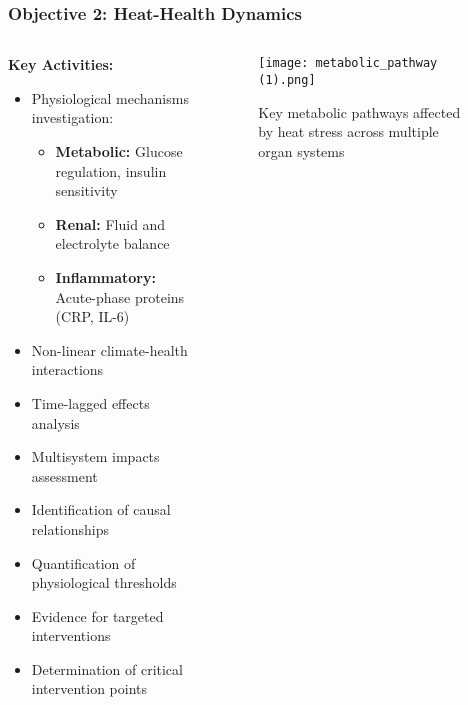 \documentclass[aspectratio=169]{beamer}
\newcommand{\concept}[1]{\textcolor{witsteal}{\textbf{#1}}}
\begin{document}
\begin{frame}
    \frametitle{Objective 2: Heat-Health Dynamics}
    
    \begin{columns}[T]
        \begin{column}{0.55\textwidth}
            \textbf{\large Key Activities:}
            \begin{itemize}[leftmargin=*, itemsep=6pt]
                \item Physiological mechanisms investigation:
                \begin{itemize}[itemsep=4pt]
                    \item \concept{Metabolic:} Glucose regulation, insulin sensitivity
                    \item \concept{Renal:} Fluid and electrolyte balance
                    \item \concept{Inflammatory:} Acute-phase proteins (CRP, IL-6)
                \end{itemize}
                \item Non-linear climate-health interactions
                \item Time-lagged effects analysis
                \item Multisystem impacts assessment
            \end{itemize}
            
            \begin{impactbox}
                \begin{itemize}[leftmargin=*, itemsep=6pt]
                    \item Identification of causal relationships
                    \item Quantification of physiological thresholds
                    \item Evidence for targeted interventions
                    \item Determination of critical intervention points
                \end{itemize}
            \end{impactbox}
        \end{column}
        \begin{column}{0.42\textwidth}
            \begin{figure}
                \texttt{[image: metabolic\_pathway (1).png]}
                \caption{\small Key metabolic pathways affected by heat stress across multiple organ systems}
            \end{figure}
        \end{column}
    \end{columns}
\end{frame}
\end{document}
